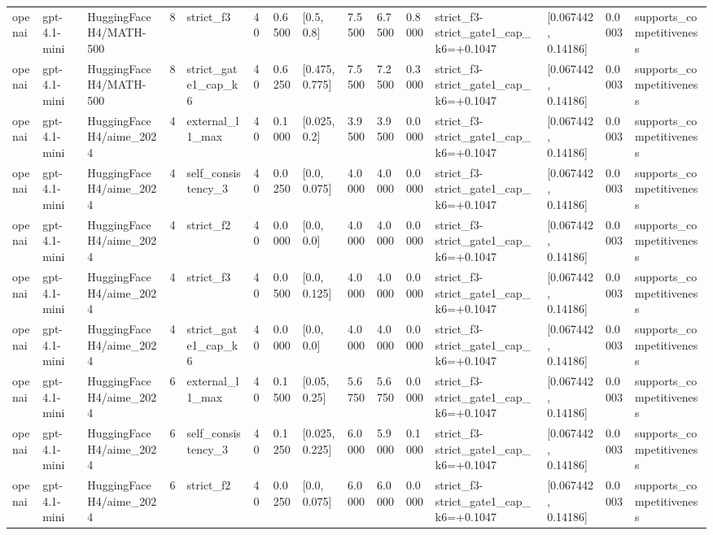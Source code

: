 \begin{tabular}{lllllllllllllll}
openai & gpt-4.1-mini & HuggingFaceH4/MATH-500 & 8 & strict\_f3 & 40 & 0.6500 & [0.5, 0.8] & 7.5500 & 6.7500 & 0.8000 & strict\_f3-strict\_gate1\_cap\_k6=+0.1047 & [0.067442, 0.14186] & 0.0003 & supports\_competitiveness \\
openai & gpt-4.1-mini & HuggingFaceH4/MATH-500 & 8 & strict\_gate1\_cap\_k6 & 40 & 0.6250 & [0.475, 0.775] & 7.5500 & 7.2500 & 0.3000 & strict\_f3-strict\_gate1\_cap\_k6=+0.1047 & [0.067442, 0.14186] & 0.0003 & supports\_competitiveness \\
openai & gpt-4.1-mini & HuggingFaceH4/aime\_2024 & 4 & external\_l1\_max & 40 & 0.1000 & [0.025, 0.2] & 3.9500 & 3.9500 & 0.0000 & strict\_f3-strict\_gate1\_cap\_k6=+0.1047 & [0.067442, 0.14186] & 0.0003 & supports\_competitiveness \\
openai & gpt-4.1-mini & HuggingFaceH4/aime\_2024 & 4 & self\_consistency\_3 & 40 & 0.0250 & [0.0, 0.075] & 4.0000 & 4.0000 & 0.0000 & strict\_f3-strict\_gate1\_cap\_k6=+0.1047 & [0.067442, 0.14186] & 0.0003 & supports\_competitiveness \\
openai & gpt-4.1-mini & HuggingFaceH4/aime\_2024 & 4 & strict\_f2 & 40 & 0.0000 & [0.0, 0.0] & 4.0000 & 4.0000 & 0.0000 & strict\_f3-strict\_gate1\_cap\_k6=+0.1047 & [0.067442, 0.14186] & 0.0003 & supports\_competitiveness \\
openai & gpt-4.1-mini & HuggingFaceH4/aime\_2024 & 4 & strict\_f3 & 40 & 0.0500 & [0.0, 0.125] & 4.0000 & 4.0000 & 0.0000 & strict\_f3-strict\_gate1\_cap\_k6=+0.1047 & [0.067442, 0.14186] & 0.0003 & supports\_competitiveness \\
openai & gpt-4.1-mini & HuggingFaceH4/aime\_2024 & 4 & strict\_gate1\_cap\_k6 & 40 & 0.0000 & [0.0, 0.0] & 4.0000 & 4.0000 & 0.0000 & strict\_f3-strict\_gate1\_cap\_k6=+0.1047 & [0.067442, 0.14186] & 0.0003 & supports\_competitiveness \\
openai & gpt-4.1-mini & HuggingFaceH4/aime\_2024 & 6 & external\_l1\_max & 40 & 0.1500 & [0.05, 0.25] & 5.6750 & 5.6750 & 0.0000 & strict\_f3-strict\_gate1\_cap\_k6=+0.1047 & [0.067442, 0.14186] & 0.0003 & supports\_competitiveness \\
openai & gpt-4.1-mini & HuggingFaceH4/aime\_2024 & 6 & self\_consistency\_3 & 40 & 0.1250 & [0.025, 0.225] & 6.0000 & 5.9000 & 0.1000 & strict\_f3-strict\_gate1\_cap\_k6=+0.1047 & [0.067442, 0.14186] & 0.0003 & supports\_competitiveness \\
openai & gpt-4.1-mini & HuggingFaceH4/aime\_2024 & 6 & strict\_f2 & 40 & 0.0250 & [0.0, 0.075] & 6.0000 & 6.0000 & 0.0000 & strict\_f3-strict\_gate1\_cap\_k6=+0.1047 & [0.067442, 0.14186] & 0.0003 & supports\_competitiveness \\

\end{tabular}
